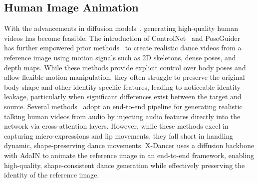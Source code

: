 \subsection{Human Image Animation}
With the advancements in diffusion models~\cite{ho2022video,guo2023animatediff,blattmann2023stable}, generating high-quality human videos has become feasible. The introduction of ControlNet~\cite{zhang2023adding} and PoseGuider~\cite{hu2024animate} has further empowered prior methods~\cite{hu2024animate,chang2023magicpose,xu2024magicanimate,zhu2024champ} to create realistic dance videos from a reference image using motion signals such as 2D skeletons, dense poses, and depth maps. While these methods provide explicit control over body poses and allow flexible motion manipulation, they often struggle to preserve the original body shape and other identity-specific features, leading to noticeable identity leakage, particularly when significant differences exist between the target and source.
Several methods~\cite{hallo,jiang2024loopy,tian2024emo} adopt an end-to-end pipeline for generating realistic talking human videos from audio by injecting audio features directly into the network via cross-attention layers. However, while these methods excel in capturing micro-expressions and lip movements, they fall short in handling dynamic, shape-preserving dance movements. X-Dancer uses a diffusion backbone with AdaIN to animate the reference image in an end-to-end framework, enabling high-quality, shape-consistent dance generation while effectively preserving the identity of the reference image.